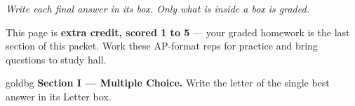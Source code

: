 \documentclass[12pt]{article}
\begin{document}
{\small\itshape Write each final answer in its box. Only what is inside a box is graded.}\par

\vspace{0.06in}

\boxguard[8]
\begin{remindbox}
\small
This page is \textbf{extra credit, scored 1 to 5} --- your graded homework is the last section
of this packet. Work these AP-format reps for practice and bring questions to study hall.
\end{remindbox}

\vspace{0.06in}

\boxguard[10]
\begin{headlinebox}{goldbg}
\small
\textbf{Section I --- Multiple Choice.} Write the letter of the single best answer in its Letter box.
\end{headlinebox}

\vspace{0.06in}
\end{document}
